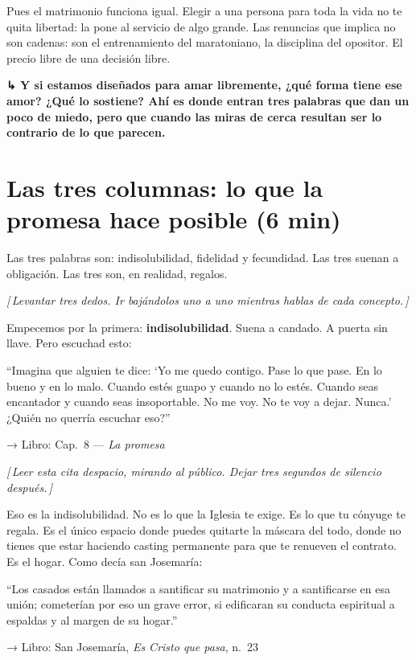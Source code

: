 \documentclass[a4paper, 11pt]{article}
\newcommand{\reflibro}[1]{%
  {\small\sffamily\color{gris} → Libro: #1}%
}
\newcommand{\nota}[1]{%
  \par\smallskip
  {\small\itshape\color{oro!80!black} [\,#1\,]}%
  \par\smallskip
}
\newcommand{\transicion}[1]{%
  \par\medskip
  {\sffamily\color{gris}\bfseries ↳ #1}%
  \par\medskip
}
\begin{document}
Pues el matrimonio funciona igual. Elegir a una persona para toda la vida no te quita libertad: la pone al servicio de algo grande. Las renuncias que implica no son cadenas: son el entrenamiento del maratoniano, la disciplina del opositor. El precio libre de una decisión libre.

\transicion{Y si estamos diseñados para amar libremente, ¿qué forma tiene ese amor? ¿Qué lo sostiene? Ahí es donde entran tres palabras que dan un poco de miedo, pero que cuando las miras de cerca resultan ser lo contrario de lo que parecen.}

\section{Las tres columnas: lo que la promesa hace posible (6 min)}

Las tres palabras son: indisolubilidad, fidelidad y fecundidad. Las tres suenan a obligación. Las tres son, en realidad, regalos.

\nota{Levantar tres dedos. Ir bajándolos uno a uno mientras hablas de cada concepto.}

Empecemos por la primera: \textbf{indisolubilidad}. Suena a candado. A puerta sin llave. Pero escuchad esto:

\begin{citalibro}
``Imagina que alguien te dice: `Yo me quedo contigo. Pase lo que pase. En lo bueno y en lo malo. Cuando estés guapo y cuando no lo estés. Cuando seas encantador y cuando seas insoportable. No me voy. No te voy a dejar. Nunca.' ¿Quién no querría escuchar eso?''
\end{citalibro}
\reflibro{Cap.\ 8 — \emph{La promesa}}

\nota{Leer esta cita despacio, mirando al público. Dejar tres segundos de silencio después.}

Eso es la indisolubilidad. No es lo que la Iglesia te exige. Es lo que tu cónyuge te regala. Es el único espacio donde puedes quitarte la máscara del todo, donde no tienes que estar haciendo casting permanente para que te renueven el contrato. Es el hogar. Como decía san Josemaría:

\begin{citalibro}
``Los casados están llamados a santificar su matrimonio y a santificarse en esa unión; cometerían por eso un grave error, si edificaran su conducta espiritual a espaldas y al margen de su hogar.''
\end{citalibro}
\reflibro{San Josemaría, \emph{Es Cristo que pasa}, n.~23}
\end{document}
